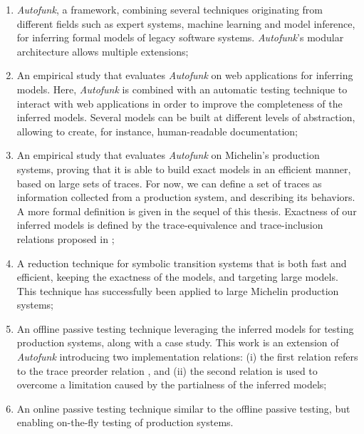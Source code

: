 \begin{enumerate}
    \item \textit{Autofunk}, a framework, combining several
        techniques originating from different fields such as
        expert systems, machine learning and model inference, for
        inferring formal models of legacy software systems.
        \textit{Autofunk}'s modular architecture allows multiple
        extensions;

    \item An empirical study that evaluates \textit{Autofunk} on
        web applications for inferring models. Here,
        \textit{Autofunk} is combined with an automatic testing
        technique to interact with web applications in order to
        improve the completeness of the inferred models. Several
        models can be built at different levels of abstraction,
        allowing to create, for instance, human-readable
        documentation;

    \item An empirical study that evaluates \textit{Autofunk} on
        Michelin's production systems, proving that it is able to
        build exact models in an efficient manner, based on large
        sets of traces. For now, we can define a set of traces as
        information collected from a production system, and
        describing its behaviors. A more formal definition is
        given in the sequel of this thesis. Exactness of our
        inferred models is defined by the trace-equivalence and
        trace-inclusion relations proposed in \cite{petrenko06};

    \item A reduction technique for symbolic transition systems
        that is both fast and efficient, keeping the exactness of
        the models, and targeting large models. This technique
        has successfully been applied to large Michelin
        production systems;

    \item An offline passive testing technique leveraging the
        inferred models for testing production systems, along
        with a case study. This work is an extension of
        \textit{Autofunk} introducing two implementation
        relations: (i) the first relation refers to the trace
        preorder relation \cite{DNH84}, and (ii) the second
        relation is used to overcome a limitation caused by the
        partialness of the inferred models;

    \item An online passive testing technique similar to the
        offline passive testing, but enabling on-the-fly testing
        of production systems.
\end{enumerate}

